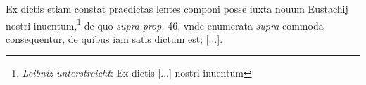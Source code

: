 \pend \pstart [p.~141] Ex  dictis etiam constat praedictas lentes\protect{} componi posse iuxta nouum Eustachij nostri inuentum,\footnote{\textit{Leibniz unterstreicht}: Ex dictis [...] nostri inuentum} de quo \textit{supra} \textit{prop.} 46. vnde enumerata \textit{supra} commoda consequentur, de quibus iam satis dictum est; [...].